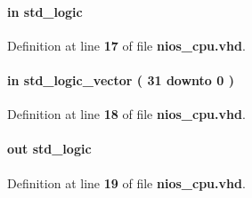\paragraph[{clk100}]{ {\bfseries \textcolor{keywordflow}{in}\textcolor{vhdlchar}{ }} {\bfseries \textcolor{comment}{std\+\_\+logic}\textcolor{vhdlchar}{ }} \hspace{0.3cm}{\ttfamily [Port]}}\label{classnios__cpu_a04d9475d651eb2582bd089d5572aed5e}


Definition at line {\bf 17} of file {\bf nios\+\_\+cpu.\+vhd}.

\paragraph[{exfifo\+\_\+if\+\_\+d}]{ {\bfseries \textcolor{keywordflow}{in}\textcolor{vhdlchar}{ }} {\bfseries \textcolor{comment}{std\+\_\+logic\+\_\+vector}\textcolor{vhdlchar}{ }\textcolor{vhdlchar}{(}\textcolor{vhdlchar}{ }\textcolor{vhdlchar}{ } \textcolor{vhdldigit}{31} \textcolor{vhdlchar}{ }\textcolor{keywordflow}{downto}\textcolor{vhdlchar}{ }\textcolor{vhdlchar}{ } \textcolor{vhdldigit}{0} \textcolor{vhdlchar}{ }\textcolor{vhdlchar}{)}\textcolor{vhdlchar}{ }} \hspace{0.3cm}{\ttfamily [Port]}}\label{classnios__cpu_a34f4a09850792dfa9dfb90a729a7cf4f}


Definition at line {\bf 18} of file {\bf nios\+\_\+cpu.\+vhd}.

\paragraph[{exfifo\+\_\+if\+\_\+rd}]{ {\bfseries \textcolor{keywordflow}{out}\textcolor{vhdlchar}{ }} {\bfseries \textcolor{comment}{std\+\_\+logic}\textcolor{vhdlchar}{ }} \hspace{0.3cm}{\ttfamily [Port]}}\label{classnios__cpu_a74d15da60be5b6fc4b1636237ed2171f}


Definition at line {\bf 19} of file {\bf nios\+\_\+cpu.\+vhd}.


